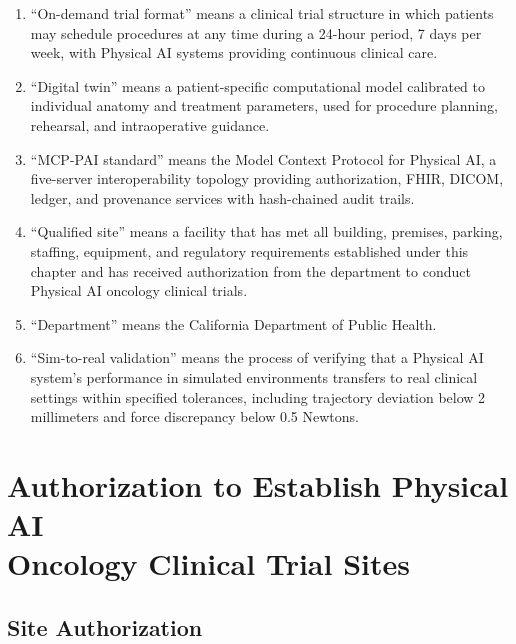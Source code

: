 \documentclass[11pt,letterpaper]{article}
\begin{document}
\begin{enumerate}[label=(\alph*)]
\item ``On-demand trial format'' means a clinical trial structure in which
  patients may schedule procedures at any time during a 24-hour period, 7 days
  per week, with Physical AI systems providing continuous clinical care.

\item ``Digital twin'' means a patient-specific computational model calibrated
  to individual anatomy and treatment parameters, used for procedure planning,
  rehearsal, and intraoperative guidance.

\item ``MCP-PAI standard'' means the Model Context Protocol for Physical AI,
  a five-server interoperability topology providing authorization, FHIR, DICOM,
  ledger, and provenance services with hash-chained audit trails.

\item ``Qualified site'' means a facility that has met all building, premises,
  parking, staffing, equipment, and regulatory requirements established under
  this chapter and has received authorization from the department to conduct
  Physical AI oncology clinical trials.

\item ``Department'' means the California Department of Public Health.

\item ``Sim-to-real validation'' means the process of verifying that a Physical
  AI system's performance in simulated environments transfers to real clinical
  settings within specified tolerances, including trajectory deviation below
  2 millimeters and force discrepancy below 0.5 Newtons.
\end{enumerate}

\section{Authorization to Establish Physical AI\\Oncology Clinical Trial Sites}

\subsection{Site Authorization}
\end{document}
